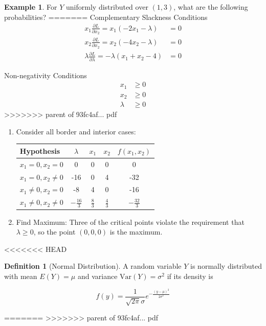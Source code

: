 \documentclass[]{book}
\providecommand{\tightlist}{%
  \setlength{\itemsep}{0pt}\setlength{\parskip}{0pt}}
\theoremstyle{definition}
\newtheorem{definition}{Definition}[chapter]
\theoremstyle{definition}
\newtheorem{example}{Example}[chapter]
\theoremstyle{definition}
\theoremstyle{remark}
\begin{document}
\begin{example}
\protect\hypertarget{exm:unnamed-chunk-92}{}{\label{exm:unnamed-chunk-92} }For \(Y\) uniformly distributed over \((1,3)\), what are the following probabilities?
=======
Complementary Slackness Conditions
\begin{align*}
x_1\frac{\partial L}{\partial x_2} = x_1(-2x_1 - \lambda)  &= 0\\
x_2\frac{\partial L}{\partial x_2} = x_2(-4x_2 - \lambda)  &= 0\\
\lambda\frac{\partial L}{\partial \lambda} = -\lambda(x_1 + x_2 - 4)&= 0
\end{align*}

Non-negativity Conditions
\begin{align*}
x_1 & \geq  0\\
x_2 & \geq 0\\
\lambda & \geq 0
\end{align*}
>>>>>>> parent of 93fc4af... pdf

\begin{enumerate}
\def\labelenumi{\arabic{enumi}.}
\setcounter{enumi}{2}
\tightlist
\item
  Consider all border and interior cases:

  \begin{center}
  \begin{tabular}{|l|ccc|c|}
  \hline
  Hypothesis  & $\lambda$& $x_1$ & $x_2$ & $f(x_1, x_2)$\\
  \hline
  $x_1 = 0, x_2 = 0$  &0 & 0 & 0 & 0\\
  $x_1 = 0, x_2 \neq 0$  &-16 & 0 & 4 & -32\\
  $x_1 \neq 0, x_2 = 0$  &-8 & 4 & 0 & -16\\
  $x_1 \neq 0, x_2 \neq 0$ & $-\frac{16}{3}$ & $\frac{8}{3}$ & $\frac{4}{3}$ & $-\frac{32}{3}$\\
  \hline
  \end{tabular}
  \end{center}
\item
  Find Maximum:
  Three of the critical points violate the requirement that \(\lambda \geq 0\), so the point \((0,0,0)\) is the maximum.
\end{enumerate}
<<<<<<< HEAD
\end{example}

\begin{definition}[Normal Distribution]
\protect\hypertarget{def:unnamed-chunk-93}{}{\label{def:unnamed-chunk-93} {} }
A random variable \(Y\) is normally distributed with mean \(E(Y)=\mu\) and variance \(\text{Var}(Y)=\sigma^2\) if its density is

\[f(y)=\frac{1}{\sqrt{2\pi}\sigma}e^{-\frac{(y-\mu)^2}{2\sigma^2}}\]
\end{definition}
=======
>>>>>>> parent of 93fc4af... pdf
\end{document}
